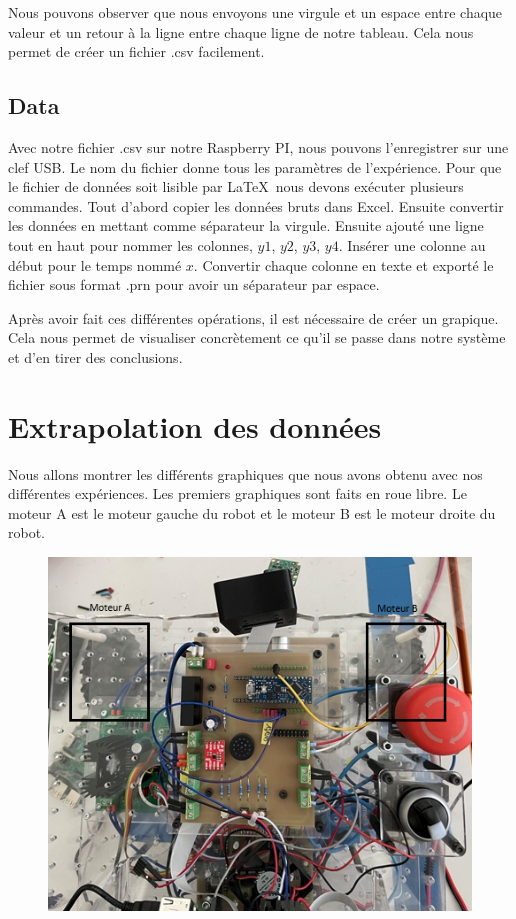 \documentclass[
	a4paper,									%
	11pt,										%
	twoside,									%
	openright,									%
	notitlepage,									%
	parskip=half,								%
]{scrreprt}										%
\begin{document}
Nous pouvons observer que nous envoyons une virgule et un espace entre chaque valeur et un retour à la ligne entre chaque ligne de notre tableau. 
Cela nous permet de créer un fichier .csv facilement. \par

\section{Data}

Avec notre fichier .csv sur notre Raspberry PI, nous pouvons l'enregistrer sur une clef USB. Le nom du fichier donne tous les paramètres 
de l'expérience. Pour que le fichier de données soit lisible par \LaTeX\ nous devons exécuter plusieurs commandes. 
Tout d'abord copier les données bruts dans Excel. Ensuite convertir les données en mettant comme séparateur la 
virgule. Ensuite ajouté une ligne tout en haut pour nommer les colonnes, $y1$, $y2$, $y3$, $y4$. 
Insérer une colonne au début pour le temps nommé $x$. Convertir chaque colonne en texte et exporté le fichier sous 
format .prn pour avoir un séparateur par espace.  \par

Après avoir fait ces différentes opérations, il est nécessaire de créer un grapique. Cela nous permet de visualiser concrètement ce qu'il 
se passe dans notre système et d'en tirer des conclusions. \par

\chapter{Extrapolation des données}

Nous allons montrer les différents graphiques que nous avons obtenu avec nos différentes expériences. Les premiers 
graphiques sont faits en roue libre. Le moteur A est le moteur gauche du robot et le moteur B est le moteur droite 
du robot. \par

\begin{figure}[!ht]
	\centering
	\includegraphics[scale=.8]{img/Haut_Robot.png}
	\vspace{.5cm}
	\label{img:img2}
\end{figure}
\end{document}

